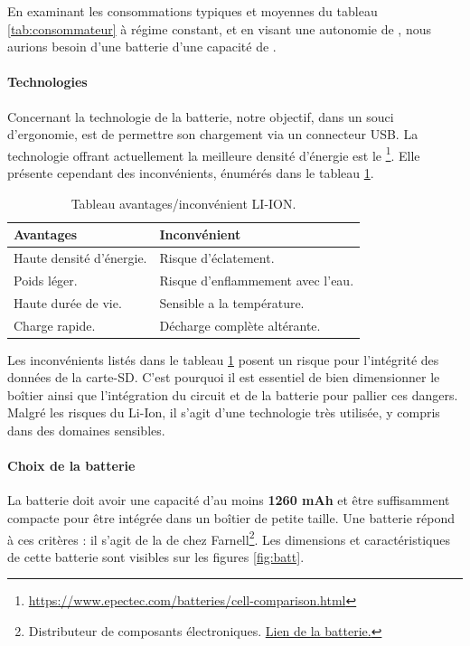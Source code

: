 En examinant les consommations typiques et moyennes du tableau \ref{tab:consommateur} à régime constant, et en visant une autonomie de , nous aurions besoin d'une batterie d'une capacité de .

\paragraph{Technologies} Concernant la technologie de la batterie, notre objectif, dans un souci d'ergonomie, est de permettre son chargement via un connecteur USB. La technologie offrant actuellement la meilleure densité d'énergie est le \footnote{\href{https://www.epectec.com/batteries/cell-comparison.html}{https://www.epectec.com/batteries/cell-comparison.html}}. Elle présente cependant des inconvénients, énumérés dans le tableau \ref{tab:inconvlion}.

\begin{table}[h]
	\centering
	\begin{tabular}{l|l}
		Avantages &  Inconvénient\\
		\hline
		Haute densité d'énergie. & Risque d'éclatement. \\
		Poids léger. & Risque d'enflammement avec l'eau. \\ 
		Haute durée de vie. & Sensible a la température. \\
		Charge rapide. & Décharge complète altérante. \\
		\hline
	\end{tabular}
		\caption{Tableau avantages/inconvénient LI-ION.}
		\label{tab:inconvlion}
\end{table}

Les inconvénients listés dans le tableau \ref{tab:inconvlion} posent un risque pour l'intégrité des données de la carte-SD. C'est pourquoi il est essentiel de bien dimensionner le boîtier ainsi que l'intégration du circuit et de la batterie pour pallier ces dangers. Malgré les risques du Li-Ion, il s'agit d'une technologie très utilisée, y compris dans des domaines sensibles.

\paragraph{Choix de la batterie} La batterie doit avoir une capacité d'au moins \textbf{1260 mAh} et être suffisamment compacte pour être intégrée dans un boîtier de petite taille. Une batterie répond à ces critères : il s'agit de la  de chez Farnell\footnote{Distributeur de composants électroniques. \href{https://ch.farnell.com/en-CH/panasonic/picpal36/battery-li-ion-1-3ah-3-7v/dp/2819223}{Lien de la batterie.}}. Les dimensions et caractéristiques de cette batterie sont visibles sur les figures \ref{fig:batt}.

